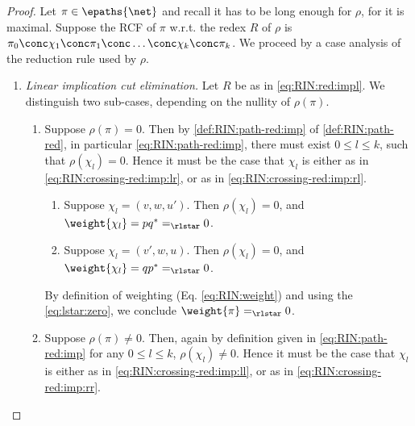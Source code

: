 \begin{proof}
Let $\pi \in \epaths{\net}$ and recall it has to be long enough for $\rho$, for 
it is maximal.
Suppose the RCF of $\pi$ w.r.t. the redex $R$ of $\rho$ is
  $\pi_0 \conc \chi_1 \conc \pi_1 \conc \ldots \conc \chi_k \conc \pi_k$.
We proceed by a case analysis of the reduction rule used by $\rho$.
\begin{enumerate}
\item \textit{Linear implication cut elimination.}
  Let $R$ be as in \autoref{eq:RIN:red:impl}.
  We distinguish two sub-cases, depending on the nullity of $\rho(\pi)$.

  \begin{enumerate}
  \item
    Suppose $\rho(\pi)=0$.
    Then by \autoref{def:RIN:path-red:imp} of \autoref{def:RIN:path-red},
    in particular \autoref{eq:RIN:path-red:imp},
    there must exist $0 \leq l \leq k$, such that
    $\rho(\chi_l) = 0$.
    Hence it must be the case that $\chi_l$ is either
    as in \autoref{eq:RIN:crossing-red:imp:lr}, or
    as in \autoref{eq:RIN:crossing-red:imp:rl}.

    \begin{enumerate}
     \item
      Suppose $\chi_l = (v,w,u')$.
      Then $\rho(\chi_l) = 0$,
      and $\weight{\chi_l} = p q^* =_\rlstar 0$.
    \item 
      Suppose $\chi_l = (v',w,u)$.
      Then $\rho(\chi_l) = 0$,
      and $\weight{\chi_l} = q p^* =_\rlstar 0$.
    \end{enumerate}
    By definition of weighting (Eq. \ref{eq:RIN:weight}) and using 
    the \autoref{eq:lstar:zero}, we conclude
    $\weight{\pi} =_\rlstar 0$.
    
  \item
    Suppose $\rho(\pi) \neq 0$.
    Then, again by definition given in \autoref{eq:RIN:path-red:imp}
    for any $0 \leq l \leq k$, $\rho(\chi_l) \neq 0$.
    Hence it must be the case that $\chi_l$ is either
    as in \autoref{eq:RIN:crossing-red:imp:ll}, or
    as in \ref{eq:RIN:crossing-red:imp:rr}.


\end{enumerate}
\end{enumerate}
\end{proof}

